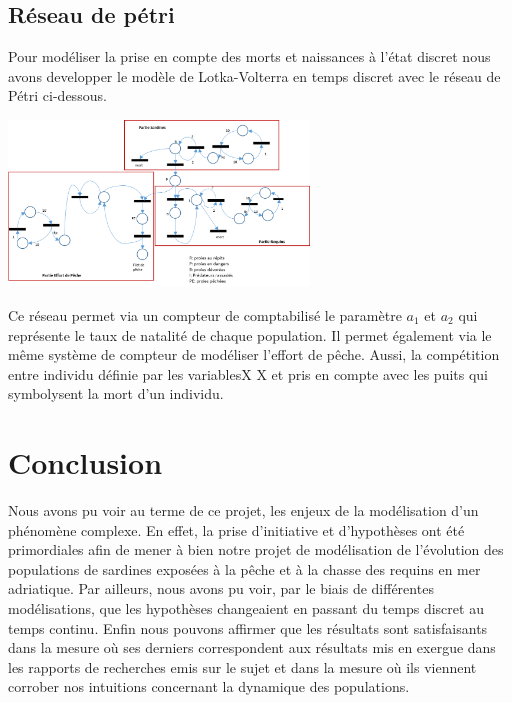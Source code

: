 \documentclass[a4paper, 11pt]{report}%
\begin{document}
        \subsection{Réseau de pétri}
        Pour modéliser la prise en compte des morts et naissances à l'état discret nous avons developper
        le modèle de Lotka-Volterra en temps discret avec le réseau de Pétri ci-dessous. 

        \begin{center}
            \includegraphics[width=8cm]{figures/reseau_petri.png}
        \end{center}

        Ce réseau permet via un compteur de comptabilisé le paramètre $a_1$ et $a_2$ qui représente le taux de
        natalité de chaque population. Il permet également via le même système de compteur de modéliser 
        l'effort de pêche. Aussi, la compétition entre individu définie par les variablesX X  et pris en
        compte avec les puits qui symbolysent la mort d'un individu. 
    \section{Conclusion}
    Nous avons pu voir au terme de ce projet, les enjeux de la modélisation d'un phénomène complexe. En effet, 
    la prise d'initiative et d'hypothèses ont été primordiales afin de mener à bien notre projet de modélisation 
    de l'évolution des populations de sardines exposées à la pêche et à la chasse des requins en mer adriatique. 
    Par ailleurs, nous avons pu voir, par le biais de différentes modélisations, que les hypothèses changeaient
    en passant du temps discret au temps continu. Enfin nous pouvons affirmer que les résultats sont satisfaisants
    dans la mesure où ses derniers correspondent aux résultats mis en exergue dans les rapports de recherches emis 
    sur le sujet et dans la mesure où ils viennent corrober nos intuitions concernant la dynamique des populations.
    \nocite{*}
    
\end{document}
